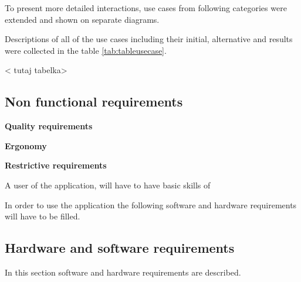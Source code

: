 To present more detailed interactions, use cases from following categories were extended and shown on separate diagrams.

 
Descriptions of all of the use cases including their initial, alternative and results were collected in the table \ref{tab:tableusecase}.
\vspace{5em}

< tutaj tabelka>
    
\subsection{Non functional requirements}
\textbf{Quality requirements}


\textbf{Ergonomy}
\label{interfaceerg}


\textbf{Restrictive requirements}

A user of the application, will have to have basic skills of 


In order to use the application the following software and hardware requirements will have to be filled.

\subsection{Hardware and software requirements}
In this section software and hardware requirements are described.


